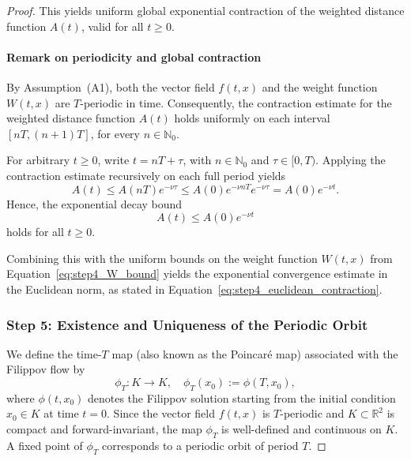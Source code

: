 \documentclass[11pt]{article}
\begin{document}
\begin{proof}
\noindent This yields uniform global exponential contraction of the weighted distance function \( A(t) \), valid for all \( t \geq 0 \).


\paragraph{Remark on periodicity and global contraction}

By Assumption~(A1), both the vector field \( f(t,x) \) and the weight function \( W(t,x) \) are \( T \)-periodic in time. Consequently, the contraction estimate for the weighted distance function \( A(t) \) holds uniformly on each interval \( [nT, (n+1)T] \), for every \( n \in \mathbb{N}_0 \).

For arbitrary \( t \geq 0 \), write \( t = nT + \tau \), with \( n \in \mathbb{N}_0 \) and \( \tau \in [0, T) \). Applying the contraction estimate recursively on each full period yields
\begin{equation} \label{eq:periodic_recursion}
	A(t) \leq A(nT) e^{-\nu \tau} \leq A(0) e^{-\nu nT} e^{-\nu \tau} = A(0) e^{-\nu t}.
\end{equation}
Hence, the exponential decay bound
\begin{equation} \label{eq:periodic_global_bound}
	A(t) \leq A(0) e^{-\nu t}
\end{equation}
holds for all \( t \geq 0 \).

Combining this with the uniform bounds on the weight function \( W(t,x) \) from Equation~\eqref{eq:step4_W_bound} yields the exponential convergence estimate in the Euclidean norm, as stated in Equation~\eqref{eq:step4_euclidean_contraction}.


\subsubsection*{Step 5: Existence and Uniqueness of the Periodic Orbit}

We define the time-\( T \) map (also known as the Poincaré map) associated with the Filippov flow by
\begin{equation} \label{eq:phiT_def}
	\phi_T : K \to K, \quad \phi_T(x_0) := \phi(T, x_0),
\end{equation}
where \( \phi(t, x_0) \) denotes the Filippov solution starting from the initial condition \( x_0 \in K \) at time \( t = 0 \). Since the vector field \( f(t,x) \) is \( T \)-periodic and \( K \subset \mathbb{R}^2 \) is compact and forward-invariant, the map \( \phi_T \) is well-defined and continuous on \( K \). A fixed point of \( \phi_T \) corresponds to a periodic orbit of period \( T \).


\end{proof}
\end{document}
